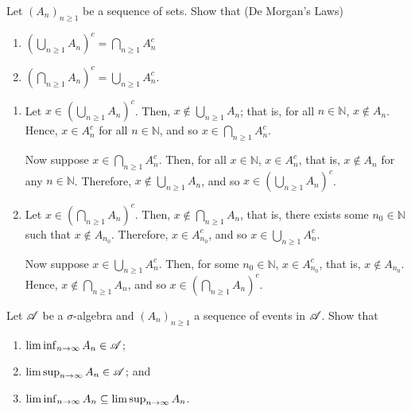 
\begin{problem}
    Let $(A_n)_{n \geq 1}$ be a sequence of sets. Show that (De Morgan's Laws)
    \begin{enumerate}
        \item $\left(\bigcup_{n \geq 1} A_n\right)^c = \bigcap_{n \geq 1} A_n^c$
        \item $\left(\bigcap_{n \geq 1} A_n \right)^c = \bigcup_{n \geq 1} A_n^c$.
    \end{enumerate}
\end{problem}

\begin{solution}
    \begin{enumerate}
        \item Let $x \in \left(\bigcup_{n \geq 1} A_n\right)^c$. Then, $x \not\in \bigcup_{n \geq 1} A_n$; that is, for all $n \in \mathbb{N}$, $x \not \in A_n$. Hence, $x \in A_n^c$ for all $n \in \mathbb{N}$, and so $x \in \bigcap_{n \geq 1} A_n^c$. 
        
        Now suppose $x \in \bigcap_{n \geq 1} A_n^c$. Then, for all $x \in \mathbb{N}$, $x \in A_n^c$, that is, $x \not\in A_n$ for any $n \in \mathbb{N}$. Therefore, $x \not\in \bigcup_{n \geq 1} A_n$, and so $x \in \left( \bigcup_{n \geq 1} A_n \right)^c$.
        
        \item Let $x \in \left( \bigcap_{n \geq 1} A_n \right)^c$. Then, $x \not\in \bigcap_{n \geq 1} A_n$, that is, there exists some $n_0 \in \mathbb{N}$ such that $x \not\in A_{n_0}$. Therefore, $x \in A_{n_0}^c$, and so $x \in \bigcup _{n \geq 1} A_n^c$.

        Now suppose $x \in \bigcup_{n \geq 1} A_n^c$. Then, for some $n_0 \in \mathbb{N}$, $x \in A_{n_0}^c$, that is, $x \not\in A_{n_0}$. Hence, $x \not\in \bigcap_{n \geq 1} A_n$, and so $x \in \left( \bigcap_{n \geq 1} A_n \right)^c$.
    \end{enumerate}
\end{solution}


\begin{problem}
    Let $\mathscr{A}$ be a $\sigma$-algebra and $(A_n)_{n \geq 1}$ a sequence of events in $\mathscr{A}$. Show that
    \begin{enumerate}
        \item $ \liminf_{n \to \infty} A_n \in \mathscr{A}$;
        \item $\limsup_{n \to \infty} A_n \in \mathscr{A}$; and
        \item $\liminf_{n \to \infty} A_n \subseteq \limsup_{n \to \infty} A_n$.
    \end{enumerate}
\end{problem}

